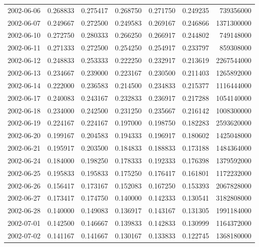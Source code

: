 \begin{tabular}{lrrrrrr}
2002-06-06 &    0.268833 &    0.275417 &    0.268750 &    0.271750 &    0.249235 &   739356000 \\
2002-06-07 &    0.249667 &    0.272500 &    0.249583 &    0.269167 &    0.246866 &  1371300000 \\
2002-06-10 &    0.272750 &    0.280333 &    0.266250 &    0.266917 &    0.244802 &   749148000 \\
2002-06-11 &    0.271333 &    0.272500 &    0.254250 &    0.254917 &    0.233797 &   859308000 \\
2002-06-12 &    0.248833 &    0.253333 &    0.222250 &    0.232917 &    0.213619 &  2267544000 \\
2002-06-13 &    0.234667 &    0.239000 &    0.223167 &    0.230500 &    0.211403 &  1265892000 \\
2002-06-14 &    0.222000 &    0.236583 &    0.214500 &    0.234833 &    0.215377 &  1116444000 \\
2002-06-17 &    0.240083 &    0.243167 &    0.232833 &    0.236917 &    0.217288 &  1054140000 \\
2002-06-18 &    0.234000 &    0.242500 &    0.231250 &    0.235667 &    0.216142 &  1008300000 \\
2002-06-19 &    0.224167 &    0.224167 &    0.197000 &    0.198750 &    0.182283 &  2593620000 \\
2002-06-20 &    0.199167 &    0.204583 &    0.194333 &    0.196917 &    0.180602 &  1425048000 \\
2002-06-21 &    0.195917 &    0.203500 &    0.184833 &    0.188833 &    0.173188 &  1484364000 \\
2002-06-24 &    0.184000 &    0.198250 &    0.178333 &    0.192333 &    0.176398 &  1379592000 \\
2002-06-25 &    0.195833 &    0.195833 &    0.175250 &    0.176417 &    0.161801 &  1172232000 \\
2002-06-26 &    0.156417 &    0.173167 &    0.152083 &    0.167250 &    0.153393 &  2067828000 \\
2002-06-27 &    0.173417 &    0.174750 &    0.140000 &    0.142333 &    0.130541 &  3182808000 \\
2002-06-28 &    0.140000 &    0.149083 &    0.136917 &    0.143167 &    0.131305 &  1991184000 \\
2002-07-01 &    0.142500 &    0.146667 &    0.139833 &    0.142833 &    0.130999 &  1164372000 \\
2002-07-02 &    0.141167 &    0.141667 &    0.130167 &    0.133833 &    0.122745 &  1368180000 \\

\end{tabular}
